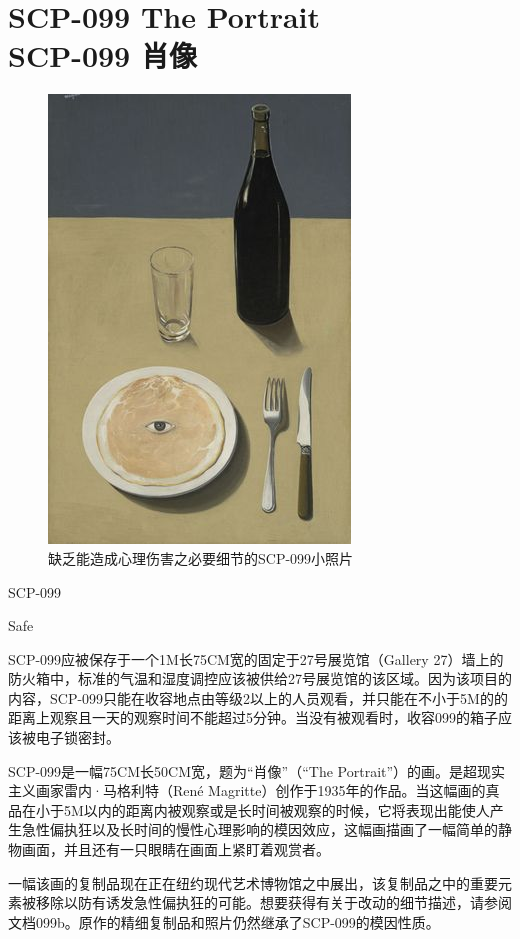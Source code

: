 \chapter[SCP-099 肖像]{
    SCP-099 The Portrait\\
    SCP-099 肖像
}

\label{chap:SCP-099}

\begin{figure}[H]
    \centering
    \includegraphics[width=0.5\linewidth]{images/SCP-099.jpg}
    \caption*{缺乏能造成心理伤害之必要细节的SCP-099小照片}
\end{figure}

SCP-099

Safe

SCP-099应被保存于一个1M长75CM宽的固定于27号展览馆（Gallery 27）墙上的防火箱中，标准的气温和湿度调控应该被供给27号展览馆的该区域。因为该项目的内容，SCP-099只能在收容地点由等级2以上的人员观看，并只能在不小于5M的的距离上观察且一天的观察时间不能超过5分钟。当没有被观看时，收容099的箱子应该被电子锁密封。

SCP-099是一幅75CM长50CM宽，题为“肖像”（“The Portrait”）的画。是超现实主义画家雷内·马格利特（René Magritte）创作于1935年的作品。当这幅画的真品在小于5M以内的距离内被观察或是长时间被观察的时候，它将表现出能使人产生急性偏执狂以及长时间的慢性心理影响的模因效应，这幅画描画了一幅简单的静物画面，并且还有一只眼睛在画面上紧盯着观赏者。

一幅该画的复制品现在正在纽约现代艺术博物馆之中展出，该复制品之中的重要元素被移除以防有诱发急性偏执狂的可能。想要获得有关于改动的细节描述，请参阅文档099b。原作的精细复制品和照片仍然继承了SCP-099的模因性质。

